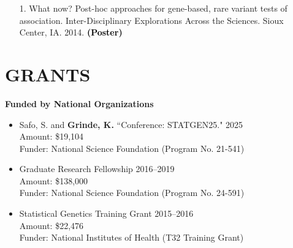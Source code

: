 \documentclass[margin]{res}
\newcommand{\annotate}[1]{\textcolor{black}{\textbf{(#1)}}}
\newcommand{\annotateItem}[1]{
	\begin{itemize} \vspace{-0.1cm}
	\item[] 
	\begin{footnotesize}\textcolor{black}{(#1)}\end{footnotesize}
	\end{itemize} \vspace{-0.1cm}
}
\begin{document}
\begin{resume}
\begin{itemize}
\item[1.] %
What now? Post-hoc approaches for gene-based, rare variant tests of association. 
Inter-Disciplinary Explorations Across the Sciences. Sioux Center, IA. 2014.  
\annotate{Poster}\\%

\end{itemize}




\section{GRANTS}

\textbf{Funded by National Organizations}
\begin{itemize}
\item Safo, S. and \textbf{Grinde, K.} ``Conference: STATGEN25."  \hfill 2025 \\ 
Amount: \$19,104 \\ %
Funder: National Science Foundation (Program No. 21-541)
	
\item Graduate Research Fellowship \hfill 2016--2019 \\
Amount: \$138,000 \\
Funder: National Science Foundation (Program No. 24-591)

\item Statistical Genetics Training Grant \hfill 2015--2016  \\
Amount: \$22,476 \\
Funder: National Institutes of Health (T32 Training Grant) %
\end{itemize}


\end{resume}
\end{document}
